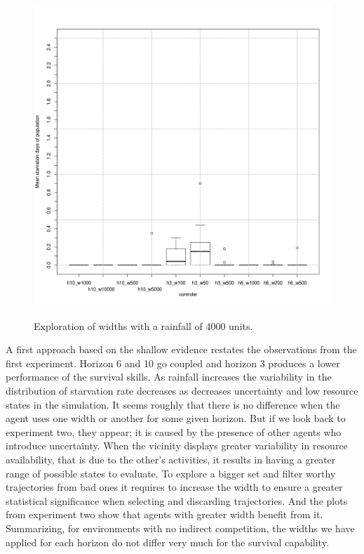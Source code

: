 \documentclass[11pt,oneside,a4paper,openright]{report}
\begin{document}
\begin{figure}[!htb]
\centering
\includegraphics[height=12.2cm]{figures/expm/ecsi3_clim4000}
\caption{Exploration of widths with a rainfall of 4000 units.}
\label{fig:ecsi3_clim4000}
\end{figure}


A first approach based on the shallow evidence restates the observations from the first experiment. Horizon 6 and 10 go coupled and horizon 3 produces a lower performance of the survival skills. As rainfall increases the variability in the distribution of starvation rate decreases as decreases uncertainty and low resource states in the simulation.
It seems roughly that there is no difference when the agent uses one width or another for some given horizon. But if we look back to experiment two, they appear; it is caused by the presence of other agents who introduce uncertainty. 
When the vicinity displays greater variability in resource availability, that is due to the other's activities, it results in having a greater range of possible states to evaluate. To explore a bigger set and filter worthy trajectories from bad ones it requires to increase the width to ensure a greater statistical significance when selecting and discarding trajectories. And the plots from experiment two show that agents with greater width benefit from it.
Summarizing, for environments with no indirect competition, the widths we have applied for each horizon do not differ very much for the survival capability.
\end{document}
